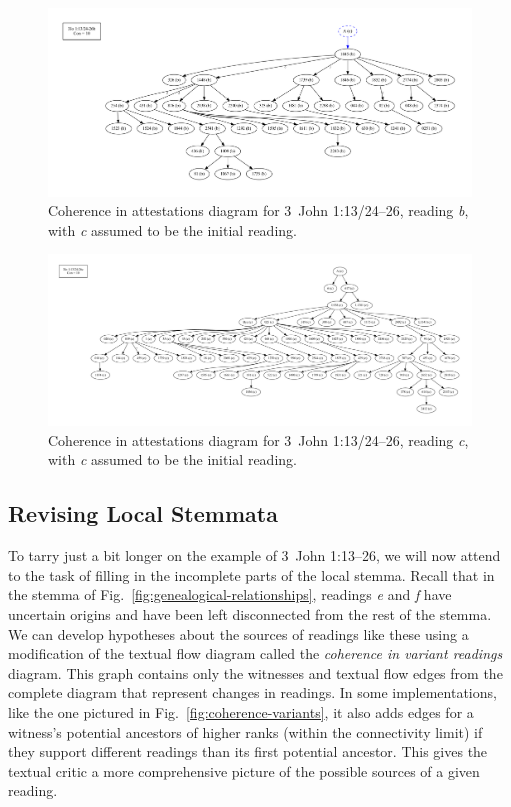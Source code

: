 \documentclass[a4paper, 12pt]{article}
\begin{document}
	\begin{figure}
		\centering
		\includegraphics[scale=0.3333]{../graphics/B25K1V13U24-26Rb-coherence-attestations-3.pdf}
		\caption{Coherence in attestations diagram for 3~John 1:13/24–26, reading \emph{b}, with \emph{c} assumed to be the initial reading.}
		\label{fig:coherence-b-3}
	\end{figure}
	
	\begin{figure}
		\centering
		\includegraphics[scale=0.3333]{../graphics/B25K1V13U24-26Rc-coherence-attestations-3.pdf}
		\caption{Coherence in attestations diagram for 3~John 1:13/24–26, reading \emph{c}, with \emph{c} assumed to be the initial reading.}
		\label{fig:coherence-c-3}
	\end{figure}
	
	\newpage
	
	\subsection{Revising Local Stemmata}\label{subsec:revising-local-stemmata}
	To tarry just a bit longer on the example of 3~John 1:13–26, we will now attend to the task of filling in the incomplete parts of the local stemma. Recall that in the stemma of Fig.~\ref{fig:genealogical-relationships}, readings \emph{e} and \emph{f} have uncertain origins and have been left disconnected from the rest of the stemma. We can develop hypotheses about the sources of readings like these using a modification of the textual flow diagram called the \emph{coherence in variant readings} diagram. This graph contains only the witnesses and textual flow edges from the complete diagram that represent changes in readings. In some implementations, like the one pictured in Fig.~\ref{fig:coherence-variants}, it also adds edges for a witness's potential ancestors of higher ranks (within the connectivity limit) if they support different readings than its first potential ancestor. This gives the textual critic a more comprehensive picture of the possible sources of a given reading.
	
\end{document}
